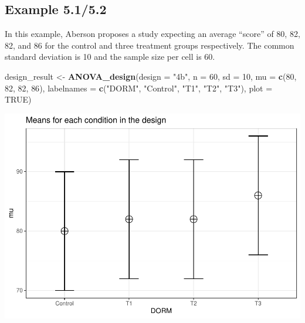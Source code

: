 \documentclass[]{book}
\newenvironment{Shaded}{\begin{snugshade}}{\end{snugshade}}
\newcommand{\DataTypeTok}[1]{\textcolor[rgb]{0.13,0.29,0.53}{#1}}
\newcommand{\DecValTok}[1]{\textcolor[rgb]{0.00,0.00,0.81}{#1}}
\newcommand{\KeywordTok}[1]{\textcolor[rgb]{0.13,0.29,0.53}{\textbf{#1}}}
\newcommand{\NormalTok}[1]{#1}
\newcommand{\OtherTok}[1]{\textcolor[rgb]{0.56,0.35,0.01}{#1}}
\newcommand{\StringTok}[1]{\textcolor[rgb]{0.31,0.60,0.02}{#1}}
\begin{document}
\hypertarget{example-5.15.2}{%
\subsection{Example 5.1/5.2}\label{example-5.15.2}}

In this example, Aberson proposes a study expecting an average ``score'' of 80, 82, 82, and 86 for the control and three treatment groups respectively. The common standard deviation is 10 and the sample size per cell is 60.

\begin{Shaded}
\begin{Highlighting}[]
\NormalTok{design_result <-}\StringTok{ }\KeywordTok{ANOVA_design}\NormalTok{(}\DataTypeTok{design =} \StringTok{"4b"}\NormalTok{,}
                              \DataTypeTok{n =} \DecValTok{60}\NormalTok{,}
                              \DataTypeTok{sd =} \DecValTok{10}\NormalTok{,}
                              \DataTypeTok{mu =} \KeywordTok{c}\NormalTok{(}\DecValTok{80}\NormalTok{, }\DecValTok{82}\NormalTok{, }\DecValTok{82}\NormalTok{, }\DecValTok{86}\NormalTok{),}
                              \DataTypeTok{labelnames =} \KeywordTok{c}\NormalTok{(}\StringTok{"DORM"}\NormalTok{,}
                              \StringTok{"Control"}\NormalTok{,}
                              \StringTok{"T1"}\NormalTok{,}
                              \StringTok{"T2"}\NormalTok{,}
                              \StringTok{"T3"}\NormalTok{),}
                              \DataTypeTok{plot =} \OtherTok{TRUE}\NormalTok{)}
\end{Highlighting}
\end{Shaded}

\includegraphics{SuperpowerValidation_files/figure-latex/aberson_appendix-1.pdf}
\end{document}
